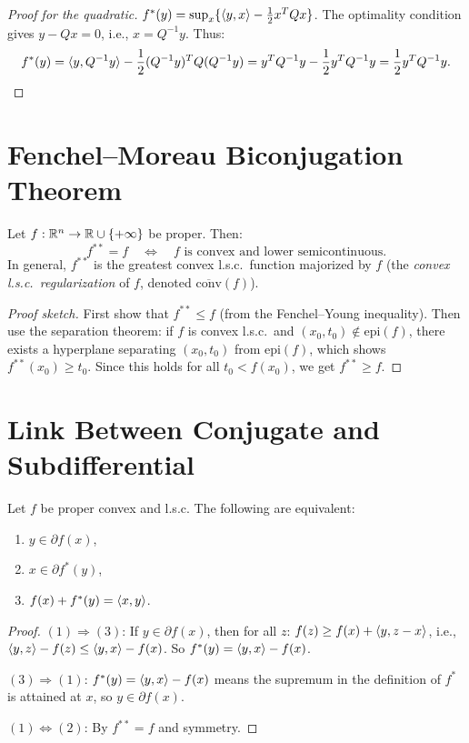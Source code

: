 \begin{proof}[Proof for the quadratic]
$f^*(y) = \sup_x \{\langle y, x \rangle - \frac{1}{2}x^TQx\}$. The optimality condition
gives $y - Qx = 0$, i.e., $x = Q^{-1}y$. Thus:
\[
    f^*(y) = \langle y, Q^{-1}y \rangle - \frac{1}{2}(Q^{-1}y)^TQ(Q^{-1}y)
    = y^TQ^{-1}y - \frac{1}{2}y^TQ^{-1}y = \frac{1}{2}y^TQ^{-1}y.
\]
\end{proof}

\section{Fenchel--Moreau Biconjugation Theorem}

\begin{theorem}
\label{thm:fenchel_moreau}
Let $f : \mathbb{R}^n \to \mathbb{R} \cup \{+\infty\}$ be proper. Then:
\[
    f^{**} = f \quad \Longleftrightarrow \quad
    f \text{ is convex and lower semicontinuous.}
\]
In general, $f^{**}$ is the greatest convex l.s.c.\ function majorized by $f$
(the \emph{convex l.s.c.\ regularization} of $f$, denoted $\overline{\mathrm{conv}}(f)$).
\end{theorem}

\begin{proof}[Proof sketch]
First show that $f^{**} \leq f$ (from the Fenchel--Young inequality). Then use the
separation theorem: if $f$ is convex l.s.c.\ and $(x_0, t_0) \notin \mathrm{epi}(f)$,
there exists a hyperplane separating $(x_0, t_0)$ from $\mathrm{epi}(f)$, which shows
$f^{**}(x_0) \geq t_0$. Since this holds for all $t_0 < f(x_0)$, we get $f^{**} \geq f$.
\end{proof}

\section{Link Between Conjugate and Subdifferential}

\begin{theorem}
\label{thm:conjugate_subdiff}
Let $f$ be proper convex and l.s.c. The following are equivalent:
\begin{enumerate}
    \item $y \in \partial f(x)$,
    \item $x \in \partial f^*(y)$,
    \item $f(x) + f^*(y) = \langle x, y \rangle$.
\end{enumerate}
\end{theorem}

\begin{proof}
$(1) \Rightarrow (3)$: If $y \in \partial f(x)$, then for all $z$:
$f(z) \geq f(x) + \langle y, z-x \rangle$, i.e., $\langle y, z \rangle - f(z) \leq \langle y, x \rangle - f(x)$.
So $f^*(y) = \langle y, x \rangle - f(x)$.

$(3) \Rightarrow (1)$: $f^*(y) = \langle y, x \rangle - f(x)$ means the supremum in the
definition of $f^*$ is attained at $x$, so $y \in \partial f(x)$.

$(1) \Leftrightarrow (2)$: By $f^{**} = f$ and symmetry.
\end{proof}

